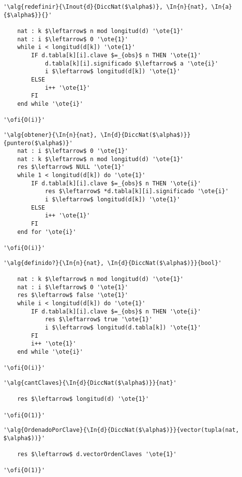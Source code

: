 \begin{lstlisting}[mathescape]
'\alg{redefinir}{\Inout{d}{DiccNat($\alpha$)}, \In{n}{nat}, \In{a}{$\alpha$}}{}'

	nat : k $\leftarrow$ n mod longitud(d) '\ote{1}'
	nat : i $\leftarrow$ 0 '\ote{1}'
	while i < longitud(d[k]) '\ote{1}'
		IF d.tabla[k][i].clave $=_{obs}$ n THEN '\ote{1}'
			d.tabla[k][i].significado $\leftarrow$ a '\ote{i}'
			i $\leftarrow$ longitud(d[k]) '\ote{1}'
		ELSE
			i++ '\ote{1}'
		FI
	end while '\ote{i}'

'\ofi{O(i)}'
\end{lstlisting}

\begin{lstlisting}[mathescape]
'\alg{obtener}{\In{n}{nat}, \In{d}{DiccNat($\alpha$)}}{puntero($\alpha$)}'
	nat : i $\leftarrow$ 0 '\ote{1}'
	nat : k $\leftarrow$ n mod longitud(d) '\ote{1}'
	res $\leftarrow$ NULL '\ote{1}'
	while 1 < longitud(d[k]) do '\ote{1}'
		IF d.tabla[k][i].clave $=_{obs}$ n THEN '\ote{i}'
			res $\leftarrow$ *d.tabla[k][i].significado '\ote{i}'
			i $\leftarrow$ longitud(d[k]) '\ote{1}'
		ELSE
			i++ '\ote{1}'
		FI
	end for '\ote{i}'

'\ofi{O(i)}'
\end{lstlisting}

\begin{lstlisting}[mathescape]
'\alg{definido?}{\In{n}{nat}, \In{d}{DiccNat($\alpha$)}}{bool}'

	nat : k $\leftarrow$ n mod longitud(d) '\ote{1}'
	nat : i $\leftarrow$ 0 '\ote{1}'
	res $\leftarrow$ false '\ote{1}'
	while i < longitud(d[k]) do '\ote{1}'
		IF d.tabla[k][i].clave $=_{obs}$ n THEN '\ote{i}'
			res $\leftarrow$ true '\ote{1}'
			i $\leftarrow$ longitud(d.tabla[k]) '\ote{1}'
		FI
		i++ '\ote{1}'
	end while '\ote{i}'

'\ofi{O(i)}'
\end{lstlisting}

\begin{lstlisting}[mathescape]
'\alg{cantClaves}{\In{d}{DiccNat($\alpha$)}}{nat}'

	res $\leftarrow$ longitud(d) '\ote{1}'

'\ofi{O(1)}'
\end{lstlisting}

\begin{lstlisting}[mathescape]
'\alg{OrdenadoPorClave}{\In{d}{DiccNat($\alpha$)}}{vector(tupla(nat, $\alpha$))}'

	res $\leftarrow$ d.vectorOrdenClaves '\ote{1}'

'\ofi{O(1)}'
\end{lstlisting}


